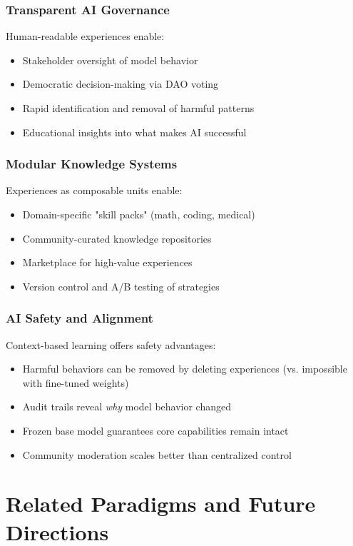 \documentclass[11pt,a4paper]{article}
\begin{document}
\subsubsection{Transparent AI Governance}
Human-readable experiences enable:
\begin{itemize}
    \item Stakeholder oversight of model behavior
    \item Democratic decision-making via DAO voting
    \item Rapid identification and removal of harmful patterns
    \item Educational insights into what makes AI successful
\end{itemize}

\subsubsection{Modular Knowledge Systems}
Experiences as composable units enable:
\begin{itemize}
    \item Domain-specific "skill packs" (math, coding, medical)
    \item Community-curated knowledge repositories
    \item Marketplace for high-value experiences
    \item Version control and A/B testing of strategies
\end{itemize}

\subsubsection{AI Safety and Alignment}
Context-based learning offers safety advantages:
\begin{itemize}
    \item Harmful behaviors can be removed by deleting experiences (vs. impossible with fine-tuned weights)
    \item Audit trails reveal \textit{why} model behavior changed
    \item Frozen base model guarantees core capabilities remain intact
    \item Community moderation scales better than centralized control
\end{itemize}

\section{Related Paradigms and Future Directions}
\end{document}
